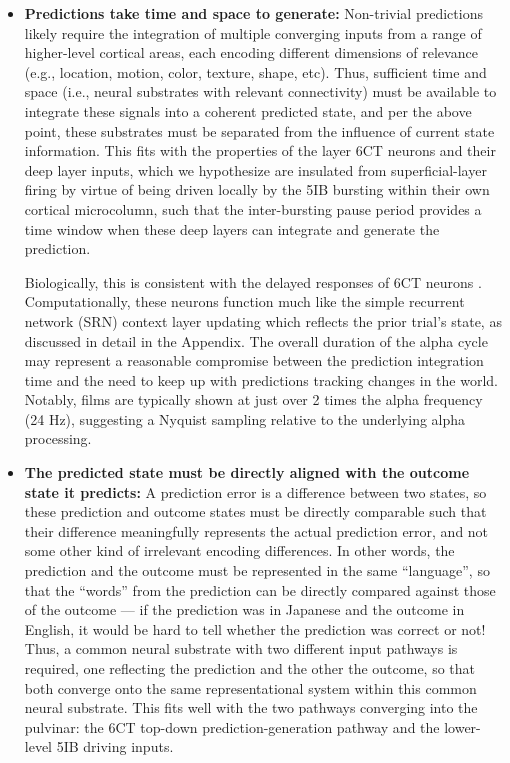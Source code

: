 \documentclass[11pt,twoside]{article}
\newif\myifpdf
\begin{document}
\begin{itemize}
	\item {\bf Predictions take time and space to generate:} Non-trivial predictions likely require the integration of multiple converging inputs from a range of higher-level cortical areas, each encoding different dimensions of relevance (e.g., location, motion, color, texture, shape, etc).  Thus, sufficient time and space (i.e., neural substrates with relevant connectivity) must be available to integrate these signals into a coherent predicted state, and per the above point, these substrates must be separated from the influence of current state information.  This fits with the properties of the layer 6CT neurons and their deep layer inputs, which we hypothesize are insulated from superficial-layer firing by virtue of being driven locally by the 5IB bursting within their own cortical microcolumn, such that the inter-bursting pause period provides a time window when these deep layers can integrate and generate the prediction.
	
	Biologically, this is consistent with the delayed responses of 6CT neurons \citep{HarrisShepherd15,SakataHarris09,Thomson10}.  Computationally, these neurons function much like the simple recurrent network (SRN) context layer updating \citep{Elman90,Jordan89} which reflects the prior trial's state, as discussed in detail in the Appendix.  The overall duration of the alpha cycle may represent a reasonable compromise between the prediction integration time and the need to keep up with predictions tracking changes in the world.  Notably, films are typically shown at just over 2 times the alpha frequency (24 Hz), suggesting a Nyquist sampling relative to the underlying alpha processing.

	\item {\bf The predicted state must be directly aligned with the outcome state it predicts:} A prediction error is a difference between two states, so these prediction and outcome states must be directly comparable such that their difference meaningfully represents the actual prediction error, and not some other kind of irrelevant encoding differences.  In other words, the prediction and the outcome must be represented in the same ``language'', so that the ``words'' from the prediction can be directly compared against those of the outcome --- if the prediction was in Japanese and the outcome in English, it would be hard to tell whether the prediction was correct or not!  Thus, a common neural substrate with two different input pathways is required, one reflecting the prediction and the other the outcome, so that both converge onto the same representational system within this common neural substrate.  This fits well with the two pathways converging into the pulvinar: the 6CT top-down prediction-generation pathway and the lower-level 5IB driving inputs.


\end{itemize}
\end{document}
